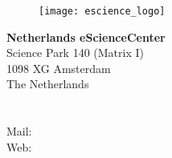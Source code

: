 

\setlength{\parindent}{0pt}
\setlength{\parskip}{1em}



\begin{center}
\begin{figure}[htbp]
\centerline{\texttt{[image: escience\_logo]}}
\end{figure}
\end{center}
 
\vspace{10cm} 

\textbf{Netherlands eScienceCenter} \\
Science Park 140 (Matrix I)\\
1098 XG Amsterdam\\
The Netherlands \\
\\
 \\
Mail:  \\
Web:  \\
